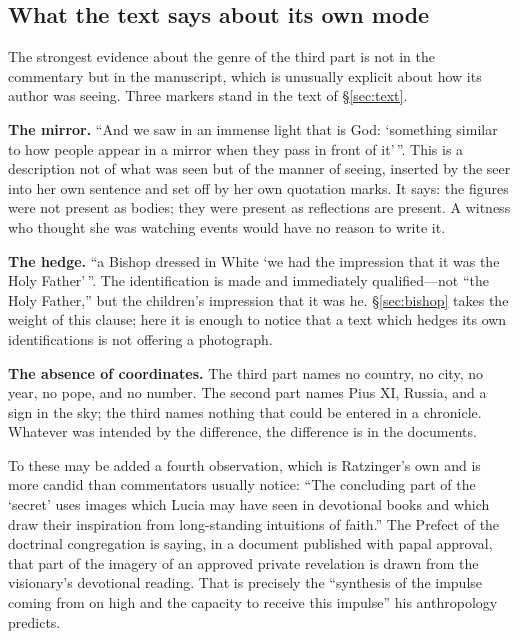 \subsection{What the text says about its own mode}

The strongest evidence about the genre of the third part is not in
the commentary but in the manuscript, which is unusually explicit
about how its author was seeing. Three markers stand in the text of
\S\ref{sec:text}.

\textbf{The mirror.} ``And we saw in an immense light that is God:
`something similar to how people appear in a mirror when they pass in
front of it'\,''. This is a description not of what was seen but of
the manner of seeing, inserted by the seer into her own sentence and
set off by her own quotation marks. It says: the figures were not
present as bodies; they were present as reflections are present. A
witness who thought she was watching events would have no reason to
write it.

\textbf{The hedge.} ``a Bishop dressed in White `we had the
impression that it was the Holy Father'\,''. The identification is
made and immediately qualified---not ``the Holy Father,'' but the
children's impression that it was he. \S\ref{sec:bishop} takes the
weight of this clause; here it is enough to notice that a text which
hedges its own identifications is not offering a photograph.

\textbf{The absence of coordinates.} The third part names no country,
no city, no year, no pope, and no number. The second part names Pius
XI, Russia, and a sign in the sky; the third names nothing that could
be entered in a chronicle. Whatever was intended by the difference,
the difference is in the documents.

To these may be added a fourth observation, which is Ratzinger's own
and is more candid than commentators usually notice: ``The concluding
part of the `secret' uses images which Lucia may have seen in
devotional books and which draw their inspiration from long-standing
intuitions of faith.'' The Prefect of the doctrinal congregation is
saying, in a document published with papal approval, that part of the
imagery of an approved private revelation is drawn from the
visionary's devotional reading. That is precisely the ``synthesis of
the impulse coming from on high and the capacity to receive this
impulse'' his anthropology predicts.

